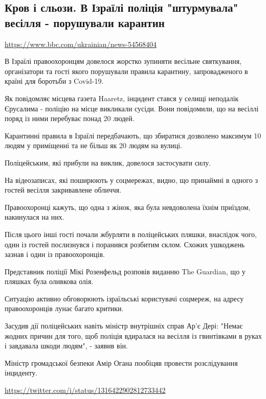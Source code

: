  
 

\subsection{Кров і сльози. В Ізраїлі поліція "штурмувала" весілля - порушували карантин}

\url{https://www.bbc.com/ukrainian/news-54568404}

В Ізраїлі правоохоронцям довелося жорстко зупиняти весільне святкування,
організатори та гості якого порушували правила карантину, запровадженого в
країні для боротьби з Covid-19.

Як повідомляє місцева газета Haaretz, інцидент стався у селищі неподалік
Єрусалима - поліцію на місце викликали сусіди. Вони повідомили, що на весіллі
поряд із ними перебуває понад 20 людей.

Карантинні правила в Ізраїлі передбачають, що збиратися дозволено максимум 10
людям у приміщенні та не більш як 20 людям на вулиці.

Поліцейським, які прибули на виклик, довелося застосувати силу.

На відеозаписах, які поширюють у соцмережах, видно, що принаймні в одного з
гостей весілля закривавлене обличчя.

Правоохоронці кажуть, що одна з жінок, яка була невдоволена їхнім приїздом,
накинулася на них.

Після цього інші гості почали жбурляти в поліцейських пляшки, внаслідок чого,
один із гостей послизнувся і поранився розбитим склом. Схожих ушкоджень зазнав
і один із правоохоронців.

Представник поліції Мікі Розенфельд розповів виданню The Guardian, що у пляшках
була оливкова олія.

Ситуацію активно обговорюють ізраїльські користувачі соцмереж, на адресу
правоохоронців лунає багато критики.

Засудив дії поліцейських навіть міністр внутрішніх справ Ар'є Дері: "Немає
жодних причин для того, щоб поліція вдиралася на весілля із гвинтівками в руках
і завдавала шкоди людям", - заявив він.

Міністр громадської безпеки Амір Огана пообіцяв провести розслідування
інциденту. 

\url{https://twitter.com/i/status/1316422902812733442}
